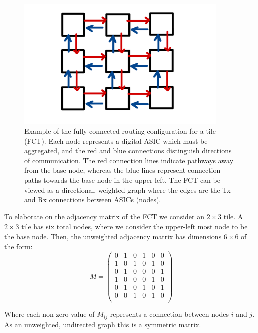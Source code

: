 \begin{figure}[]
\centering
\includegraphics[width=0.9\textwidth]{images/Broadcast.pdf}
\caption{Example of the fully connected routing configuration for a tile (FCT).
Each node represents a digital ASIC which must be aggregated, and the red and blue connections distinguish directions of communication.
The red connection lines indicate pathways away from the base node, whereas the blue lines represent connection paths towards the base node in the upper-left.
The FCT can be viewed as a directional, weighted graph where the edges are the Tx and Rx connections between ASICs (nodes).
}
\label{fig:fc_tile}
\end{figure}

To elaborate on the adjacency matrix of the FCT we consider an $2\times 3$ tile.
A $2\times 3$ tile has six total nodes, where we consider the upper-left most node to be the base node.
Then, the unweighted adjacency matrix has dimensions $6\times6$ of the form:
\begin{equation}~\label{eq:adjacency_matr}
M =
 \begin{pmatrix}
 0 & 1 & 0 & 1 & 0 & 0 \\
 1 & 0 & 1 & 0 & 1 & 0 \\
 0 & 1 & 0 & 0 & 0 & 1 \\
 1 & 0 & 0 & 0 & 1 & 0 \\
 0 & 1 & 0 & 1 & 0 & 1 \\
 0 & 0 & 1 & 0 & 1 & 0 \\
 \end{pmatrix}
\end{equation}

Where each non-zero value of $M_{ij}$ represents a connection between nodes $i$ and $j$.
As an unweighted, undirected graph this is a symmetric matrix.

